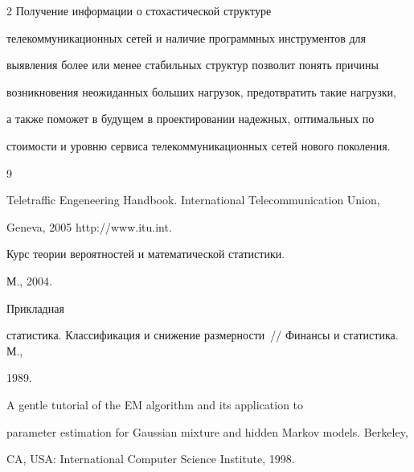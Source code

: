 \begin{multicols}{2}
Получение информации о стохастической структуре


телекоммуникационных сетей и наличие программных инструментов для


выявления более или менее стабильных структур позволит понять причины


возникновения неожиданных больших нагрузок, предотвратить такие нагрузки,


а также поможет в будущем в проектировании надежных, оптимальных по


стоимости и уровню сервиса телекоммуникационных сетей нового поколения.







{\small\frenchspacing


{%




\begin{thebibliography}{9}




Teletraffic Engeneering Handbook. International Telecommunication Union, 


Geneva, 2005 {\sf http://www.itu.int}. \vspace*{5pt} 




 Курс теории вероятностей и математической статистики. 


М., 2004. \vspace*{5pt} 




 Прикладная 


статистика. Классификация и снижение размерности~// Финансы и статистика. М., 


1989. \vspace*{5pt} 




 A gentle tutorial of the EM algorithm and its application to 


parameter estimation for Gaussian mixture and hidden Markov models. Berkeley, 


CA, USA: International Computer Science Institute,  1998. \vspace*{5pt} 



\end{thebibliography}}}
\end{multicols}
